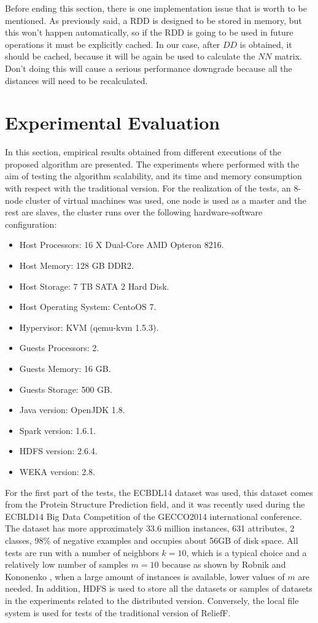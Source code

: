 Before ending this section, there is one implementation issue that is worth to be mentioned. As previously said, a RDD is designed to be stored in memory, but this won't happen automatically, so if the RDD is going to be used in future operations it must be explicitly cached. In our case, after $DD$ is obtained, it should be cached, because it will be again be used to calculate the $NN$ matrix. Don't doing this will cause a serious performance downgrade because all the distances will need to be recalculated.

\section{Experimental Evaluation}
\label{sec:experiments}

In this section, empirical results obtained from different executions of the proposed algorithm are presented. The experiments where performed with the aim of testing the algorithm scalability, and its time and memory consumption with respect with the traditional version. 
For the realization of the tests, an 8-node cluster of virtual machines was used, one node is used as a master and the rest are slaves, the cluster runs over the following hardware-software configuration:

\begin{itemize}
\item Host Processors: 16 X Dual-Core AMD Opteron 8216.
\item Host Memory: 128 GB DDR2.
\item Host Storage: 7 TB SATA 2 Hard Disk.
\item Host Operating System: CentoOS 7.
\item Hypervisor: KVM (qemu-kvm 1.5.3).
\item Guests Processors: 2.
\item Guests Memory: 16 GB.
\item Guests Storage:  500 GB.
\item Java version: OpenJDK 1.8.
\item Spark version: 1.6.1.
\item HDFS version: 2.6.4.
\item WEKA version: 2.8.
\end{itemize}

For the first part of the tests, the ECBDL14 dataset was used, this dataset comes from the Protein Structure Prediction field, and it was recently used during the ECBLD14 Big Data Competition of the GECCO2014 international conference. The dataset has more approximately 33.6 million instances, 631 attributes, 2 classes, 98\% of negative examples and occupies about 56GB of disk space. All tests are run with a number of neighbors $k=10$, which is a typical choice \cite{Kononenko1994} and a relatively low number of samples $m=10$ because as shown by Robnik and Kononenko \cite{Robnik2003}, when a large amount of instances is available, lower values of $m$ are needed. In addition, HDFS is used to store all the datasets or samples of datasets in the experiments related to the distributed version. Conversely, the local file system is used for tests of the traditional version of ReliefF.


